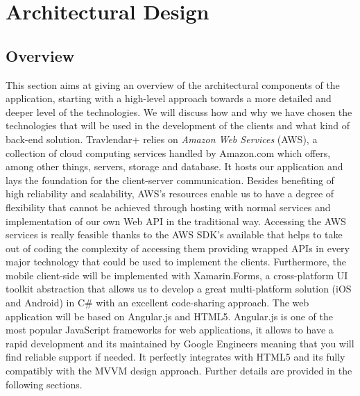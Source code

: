 \chapter{Architectural Design}
\label{cha:arch}

\section{Overview}
\label{sec:overview}
This section aims at giving an overview of the architectural components of the application, starting with a high-level approach towards a more detailed and deeper level of the technologies. We will discuss how and why we have chosen the technologies that will be used in the development of the clients and what kind of back-end solution.
\newline Travlendar+ relies on \textit{Amazon Web Services} (AWS), a collection of cloud computing services handled by Amazon.com which offers, among other things, servers, storage and database. It hosts our application and lays the foundation for the client-server communication. Besides benefiting of high reliability and scalability, AWS's resources enable us to have a degree of flexibility that cannot be achieved through hosting with normal services and implementation of our own Web API in the traditional way.
Accessing the AWS services is really feasible thanks to the AWS SDK's available that helps to take out of coding the complexity of accessing them providing wrapped APIs in every major technology that could be used to implement the clients.
Furthermore, the mobile client-side will be implemented with Xamarin.Forms, a cross-platform UI toolkit abstraction that allows us to develop a great multi-platform solution (iOS and Android) in C\# with an excellent code-sharing approach.
The web application will be based on Angular.js and HTML5.
Angular.js is one of the most popular JavaScript frameworks for web applications, it allows to have a rapid development and its maintained by Google Engineers meaning that you will find reliable support if needed. It perfectly integrates with HTML5 and its fully compatibly with the MVVM design approach. Further details are provided in the following sections.



